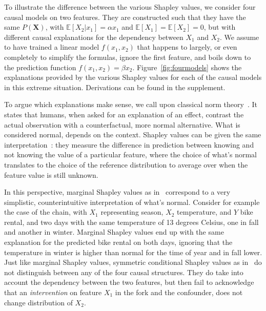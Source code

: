 \documentclass{article}
\newcommand{\vX}{\mathbf{X}}
\newcommand{\expectation}{\mathbb{E}}
\begin{document}
To illustrate the difference between the various Shapley values, we consider four causal models on two features. They are constructed such that they have the same $P(\vX)$, with $\expectation[X_2|x_1] = \alpha x_1$ and $\expectation[X_1] = \expectation[X_2] = 0$, but with different causal explanations for the dependency between $X_1$ and $X_2$.  We assume to have trained a linear model $f(x_1,x_2)$ that happens to largely, or even completely to simplify the formulas, ignore the first feature, and boils down to the prediction function $f(x_1,x_2) = \beta x_2$. Figure~\ref{fig:fourmodels} shows the explanations provided by the various Shapley values for each of the causal models in this extreme situation. Derivations can be found in the supplement.

To argue which explanations make sense, we call upon classical norm theory~\cite{kahneman1986norm}. It states that humans, when asked for an explanation of an effect, contrast the actual observation with a counterfactual, more normal alternative. What is considered normal, depends on the context. Shapley values can be given the same interpretation~\cite{merrick2019explanation}: they measure the difference in prediction between knowing and not knowing the value of a particular feature, where the choice of what's normal translates to the choice of the reference distribution to average over when the feature value is still unknown.

In this perspective, marginal Shapley values as in~\cite{datta2016algorithmic,janzing2019feature,lundberg2020local} correspond to a very simplistic, counterintuitive interpretation of what's normal. Consider for example the case of the chain, with $X_1$ representing season, $X_2$ temperature, and $Y$ bike rental, and two days with the same temperature of 13 degrees Celsius, one in fall and another in winter. Marginal Shapley values end up with the same explanation for the predicted bike rental on both days, ignoring that the temperature in winter is higher than normal for the time of year and in fall lower. Just like marginal Shapley values, symmetric conditional Shapley values as in~\cite{aas2019explaining} do not distinguish between any of the four causal structures. They do take into account the dependency between the two features, but then fail to acknowledge that an {\em intervention} on feature $X_1$ in the fork and the confounder, does not change distribution of $X_2$.
\end{document}
